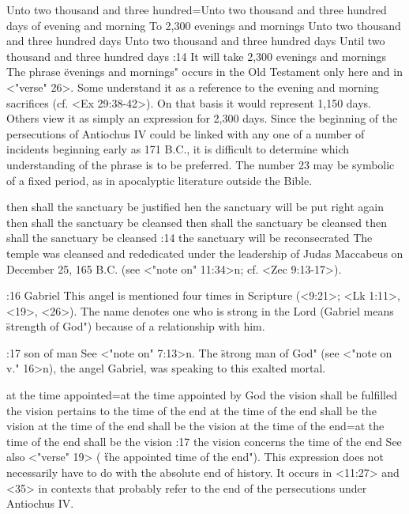     {Unto two thousand and three hundred}={Unto two thousand and three hundred days of evening and morning} %
    {To 2,300 evenings and mornings} %
    {Unto two thousand and three hundred days} %
    {Unto two thousand and three hundred days} %
    {Until two thousand and three hundred days} %
:14 {It will take 2,300 evenings and mornings} The phrase 
 \"evenings and mornings" occurs in the Old Testament only here 
and in <"verse" 26>. Some understand it as a reference to the evening 
and morning sacrifices (cf. <Ex 29:38-42>). On that basis it would represent 1,150 days. Others view
it as simply an expression for 2,300  days. Since the beginning of the persecutions of Antiochus IV
could be linked with any one of a number of incidents beginning early as 171 B.C., it is difficult to determine which understanding of  
the phrase is to be preferred. The number 23 may be symbolic of a fixed period, as in apocalyptic literature outside the Bible.

    {then shall the sanctuary be justified} %
    {hen the sanctuary will be put right again} %
    {then shall the sanctuary be cleansed} %
    {then shall the sanctuary be cleansed} %
    {then shall the sanctuary be cleansed} %
:14 {the sanctuary will be reconsecrated} The temple was cleansed 
and rededicated under the leadership of Judas Maccabeus on December 25, 165 B.C. (see <"note on" 11:34>n;
cf. <Zec 9:13-17>). 

:16 {Gabriel} This angel is mentioned four times in Scripture 
(<9:21>; <Lk 1:11>, <19>, <26>). The name denotes one who is strong in the 
Lord (Gabriel means \"strength of God") because of a relationship 
with him.

:17 {son of man} See <"note on" 7:13>n. The \"strong man of God" (see <"note on v." 16>n), the angel Gabriel, was speaking to this exalted mortal.


    {at the time appointed}={at the time appointed by God the vision shall be fulfilled} %
    {the vision pertains to the time of the end} %
    {at the time of the end shall be the vision} %
    {at the time of the end shall be the vision} %
    {at the time of the end}={at the time of the end shall be the vision} %
:17 {the vision concerns the time of the end} See also <"verse" 19> 
( \"the appointed time of the end"). This expression does not necessarily have to do with the absolute
end of history. It occurs in <11:27>  and <35> in contexts that probably refer to the end of the persecutions under Antiochus IV.

